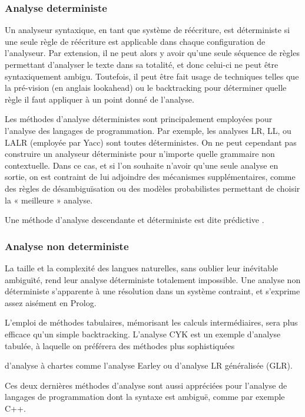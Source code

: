 \documentclass{article}
\begin{document}
\subsubsection{Analyse deterministe}

Un analyseur syntaxique, en tant que système de réécriture, est déterministe si une seule règle de réécriture est applicable dans chaque configuration de l'analyseur. Par extension, il ne peut alors y avoir qu'une seule séquence de règles permettant d'analyser le texte dans sa totalité, et donc celui-ci ne peut être syntaxiquement ambigu. Toutefois, il peut être fait usage de techniques telles que la pré-vision (en anglais lookahead) ou le backtracking pour déterminer quelle règle il faut appliquer à un point donné de l'analyse.

Les méthodes d'analyse déterministes sont principalement employées pour l'analyse des langages de programmation. Par exemple, les analyses LR, LL, ou LALR (employée par Yacc) sont toutes déterministes. On ne peut cependant pas construire un analyseur déterministe pour n'importe quelle grammaire non contextuelle. Dans ce cas, et si l'on souhaite n'avoir qu'une seule analyse en sortie, on est contraint de lui adjoindre des mécanismes supplémentaires, comme des règles de désambiguïsation ou des modèles probabilistes permettant de choisir la « meilleure » analyse.

Une méthode d’analyse descendante et déterministe est dite prédictive \cite{refAnalyseSyntaxique}.

\subsubsection{Analyse non deterministe}

La taille et la complexité des langues naturelles, sans oublier leur inévitable ambiguïté, rend leur analyse déterministe totalement impossible. Une analyse non déterministe s'apparente à une résolution dans un système contraint, et s'exprime assez aisément en Prolog.

L'emploi de méthodes tabulaires, mémorisant les calculs intermédiaires, sera plus efficace qu'un simple backtracking. L'analyse CYK est un exemple d'analyse tabulée, à laquelle on préférera des méthodes plus sophistiquées

    d'analyse à chartes comme l'analyse Earley
    ou d'analyse LR généralisée (GLR).

Ces deux dernières méthodes d'analyse sont aussi appréciées pour l'analyse de langages de programmation dont la syntaxe est ambiguë, comme par exemple C++.
\end{document}
